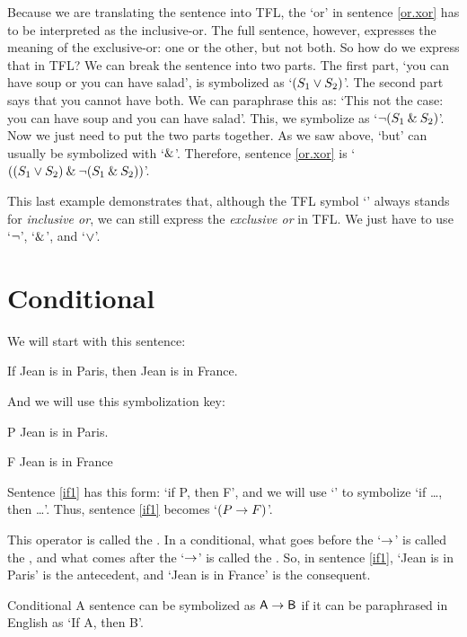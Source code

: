 Because we are translating the sentence into TFL, the `or' in sentence \ref{or.xor} has to be interpreted as the inclusive-or. The full sentence, however, expresses the meaning of the exclusive-or: one or the other, but not both. So how do we express that in TFL? We can break the sentence into two parts. The first part, `you can have soup or you can have salad', is symbolized as `$(S_1 \vee S_2)$'. The second part says that you cannot have both. We can paraphrase this as: `This not the case: you can have soup and you can have salad'. This, we symbolize as `${\neg}(S_1 \mathbin{\&} S_2)$'. Now we just need to put the two parts together. As we saw above, `but' can usually be symbolized with `$\mathbin{\&}$'. Therefore, sentence \ref{or.xor} is `$((S_1 \vee S_2) \mathbin{\&} {\neg}(S_1 \mathbin{\&} S_2))$'.

This last example demonstrates that, although the TFL symbol `\eor' always stands for \emph{inclusive or}, we can still express the \emph{exclusive or} in {TFL}. We just have to use `${\neg}$', `$\mathbin{\&}$', and `$\vee$'.

\section{Conditional}

We will start with this sentence:
	\begin{earg}
		\item[\ex{if1}] If Jean is in Paris, then Jean is in France.
	\end{earg}
And we will use this symbolization key:
	\begin{ekey}
		\item[P] Jean is in Paris.
		\item[F] Jean is in France
	\end{ekey}
Sentence \ref{if1} has this form: `if P, then F', and we will use `\eif' to symbolize `if \ldots, then \ldots'. Thus, sentence \ref{if1} becomes `$(P\rightarrow F)$'. 

This operator is called the . In a conditional, what goes before the `$\rightarrow$'  is called the , and what comes after the `$\rightarrow$' is called the . So, in sentence \ref{if1}, `Jean is in Paris' is the antecedent, and `Jean is in France' is the consequent.

\begin{factboxy}{Conditional}
		A sentence can be symbolized as $\mathsf{A} \rightarrow \mathsf{B}$ if it can be paraphrased in English as `If A, then B'.
\end{factboxy}

